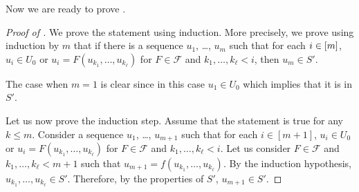 Now we are ready to prove .
\begin{proof}[Proof of ]
    We prove the statement using induction. More precisely, we prove using
    induction by $m$ that if there is a sequence
    $u_1$, \dots, $u_m$ such that
    for each $i \in {[{m}]}$, $u_i \in U_0$ or $u_i = F(u_{k_1}, \dots, u_{k_\ell})$
    for $F \in \mathcal{F}$ and $k_1, \dots, k_\ell < i$, then $u_m \in S'$.

    The case when $m = 1$ is clear since in this case $u_1 \in U_0$ which implies
    that it is in $S'$.

    Let us now prove the induction step. Assume that the statement is true for any
    $k \le m$. Consider a sequence $u_1$, \dots, $u_{m + 1}$ such that
    for each $i \in [m + 1]$,
    $u_i \in U_0$ or $u_i = F(u_{k_1}, \dots, u_{k_\ell})$
    for $F \in \mathcal{F}$ and $k_1, \dots, k_\ell < i$. Let us consider
    $F \in \mathcal{F}$ and $k_1, \dots, k_\ell < m + 1$ such that
    $u_{m + 1} = f(u_{k_1}, \dots, u_{k_\ell})$. By the induction hypothesis,
    $u_{k_1}, \dots, u_{k_\ell} \in S'$. Therefore, by the properties of $S'$,
    $u_{m + 1} \in S'$.
\end{proof}

